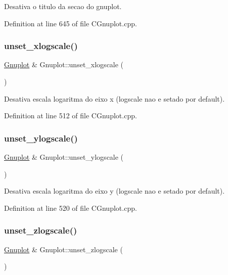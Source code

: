Desativa o titulo da secao do gnuplot. 



Definition at line 645 of file C\+Gnuplot.\+cpp.

\mbox{\label{class_gnuplot_aed8f962539fd8f53ab2c0218da7a6010}} 
\subsubsection{\texorpdfstring{unset\+\_\+xlogscale()}{unset\_xlogscale()}}
{\footnotesize\ttfamily \hyperlink{class_gnuplot}{Gnuplot} \& Gnuplot\+::unset\+\_\+xlogscale (\begin{DoxyParamCaption}{ }\end{DoxyParamCaption})}



Desativa escala logaritma do eixo x (logscale nao e setado por default). 



Definition at line 512 of file C\+Gnuplot.\+cpp.

\mbox{\label{class_gnuplot_a74ebc96273b30c98fb9c8f047dd34ac0}} 
\subsubsection{\texorpdfstring{unset\+\_\+ylogscale()}{unset\_ylogscale()}}
{\footnotesize\ttfamily \hyperlink{class_gnuplot}{Gnuplot} \& Gnuplot\+::unset\+\_\+ylogscale (\begin{DoxyParamCaption}{ }\end{DoxyParamCaption})}



Desativa escala logaritma do eixo y (logscale nao e setado por default). 



Definition at line 520 of file C\+Gnuplot.\+cpp.

\mbox{\label{class_gnuplot_a294d7473091f849fe70e4dba8df8712a}} 
\subsubsection{\texorpdfstring{unset\+\_\+zlogscale()}{unset\_zlogscale()}}
{\footnotesize\ttfamily \hyperlink{class_gnuplot}{Gnuplot} \& Gnuplot\+::unset\+\_\+zlogscale (\begin{DoxyParamCaption}{ }\end{DoxyParamCaption})}



